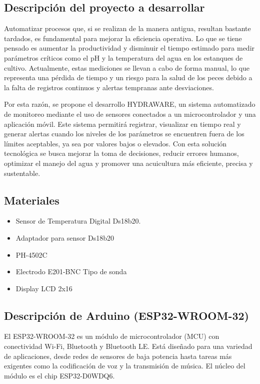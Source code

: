 \documentclass[a4paper,12pt]{article}
\begin{document}
	
	\subsection{Descripción del proyecto a desarrollar}
	Automatizar procesos que, si se realizan de la manera antigua, resultan bastante tardados, es fundamental para mejorar la eficiencia operativa. Lo que se tiene pensado es aumentar la productividad y disminuir el tiempo estimado para medir parámetros críticos como el pH y la temperatura del agua en los estanques de cultivo. Actualmente, estas mediciones se llevan a cabo de forma manual, lo que representa una pérdida de tiempo y un riesgo para la salud de los peces debido a la falta de registros continuos y alertas tempranas ante desviaciones.
	
	Por esta razón, se propone el desarrollo HYDRAWARE, un sistema automatizado de monitoreo mediante el uso de sensores conectados a un microcontrolador y una aplicación móvil. Este sistema permitirá registrar, visualizar en tiempo real y generar alertas cuando los niveles de los parámetros se encuentren fuera de los límites aceptables, ya sea por valores bajos o elevados. Con esta solución tecnológica se busca mejorar la toma de decisiones, reducir errores humanos, optimizar el manejo del agua y promover una acuicultura más eficiente, precisa y sustentable.
	
	\subsection{Materiales}
	\begin{itemize}
		\item Sensor de Temperatura Digital Ds18b20.
		\item Adaptador para sensor Ds18b20
		\item PH-4502C
		\item Electrodo E201-BNC Tipo de sonda
		\item Display LCD 2x16
	\end{itemize}
	
	\subsection{Descripción de Arduino (ESP32-WROOM-32)}
	El ESP32-WROOM-32 es un módulo de microcontrolador (MCU) con conectividad Wi-Fi, Bluetooth y Bluetooth LE. Está diseñado para una variedad de aplicaciones, desde redes de sensores de baja potencia hasta tareas más exigentes como la codificación de voz y la transmisión de música. El núcleo del módulo es el chip ESP32-D0WDQ6.
	
\end{document}
